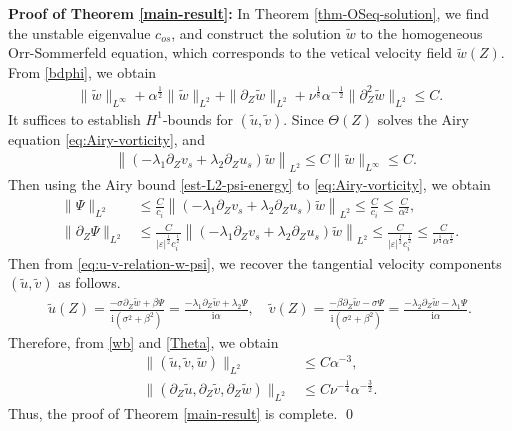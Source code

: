 \documentclass[reqno,11pt]{amsart}
\numberwithin{equation}{section}
\numberwithin{equation}{section}
\theoremstyle{plain}
\begin{document}
{\bf Proof of Theorem \ref{main-result}:} In Theorem \ref{thm-OSeq-solution}, we find the unstable eigenvalue $c_{os}$, and construct the solution $\tilde{w}$ to the homogeneous Orr-Sommerfeld equation, which corresponds to the vetical velocity field $\tilde{w}(Z)$. From \eqref{bdphi}, we obtain
    \begin{align}\label{wb}    
       	\|\tilde{w}\|_{L^\infty}+\alpha^{\frac12}\|\tilde{w}\|_{L^2}+\|\partial_Z\tilde{w}\|_{L^2}+\nu^{\frac18}\alpha^{-\frac12}\|\partial_Z^2\tilde{w}\|_{L^2}\leq C.
    \end{align}
It suffices to establish $H^1$-bounds for $(\tilde{u},\tilde{v})$. Since $\Theta(Z)$ solves the Airy equation \eqref{eq:Airy-vorticity}, and 
   \begin{align*}
        &\left\|(-\lambda_1\partial_Zv_s+\lambda_2\partial_Z u_s)\tilde{w}\right\|_{L^2}\leq C\|\tilde{w}\|_{L^\infty}\leq C.
        \end{align*}
  Then using the Airy bound \eqref{est-L2-psi-energy} to \eqref{eq:Airy-vorticity}, we obtain
  \begin{equation}
    \begin{aligned}\label{Theta}
      \|\Psi\|_{L^2}&\leq \frac{C}{c_i}\left\|(-\lambda_1\partial_Zv_s+\lambda_2\partial_Z u_s)\tilde{w}\right\|_{L^2}\leq \frac{C}{c_i}\leq \frac{C}{\alpha^2},\\
      \|\partial_Z\Psi\|_{L^2}&\leq \frac{C}{|\varepsilon|^{\frac12}c_i^{\frac12}}\left\|(-\lambda_1\partial_Zv_s+\lambda_2\partial_Z u_s)\tilde{w}\right\|_{L^2}\leq \frac{C}{|\varepsilon|^{\frac12}c_i^{\frac12}}\leq \frac{C}{\nu^{\frac14}\alpha^{\frac12}}.
    \end{aligned}
    \end{equation}
   Then from \eqref{eq:u-v-relation-w-psi}, we recover the tangential velocity components $(\tilde{u}, \tilde{v})$ as follows.
    \begin{align*}
        \tilde{u}(Z)=\frac{-\sigma \partial_Z\tilde{w}+\beta\Psi}{\mathrm{i}(\sigma^2+\beta^2)} =\frac{-\lambda_1\partial_Z\tilde{w}+\lambda_2\Psi}{\mathrm{i}\alpha},\quad \tilde{v}(Z)=\frac{-\beta \partial_Z\tilde{w}-\sigma\Psi}{\mathrm{i}(\sigma^2+\beta^2)}
        =\frac{-\lambda_2\partial_Z\tilde{w}-\lambda_1\Psi}{\mathrm{i}\alpha}.
    \end{align*}
  Therefore, from \eqref{wb} and \eqref{Theta}, we obtain
  $$
  \begin{aligned}
  	\|(\tilde{u},\tilde{v},\tilde{w})\|_{L^2}&\leq C\alpha^{-3},\\
  	\|(\partial_Z\tilde{u},\partial_Z\tilde{v},\partial_Z\tilde{w})\|_{L^2}&\leq C\nu^{-\frac14}\alpha^{-\frac32}.
  \end{aligned}
  $$
 Thus, the proof of Theorem \ref{main-result} is complete.
   \qed
\end{document}
